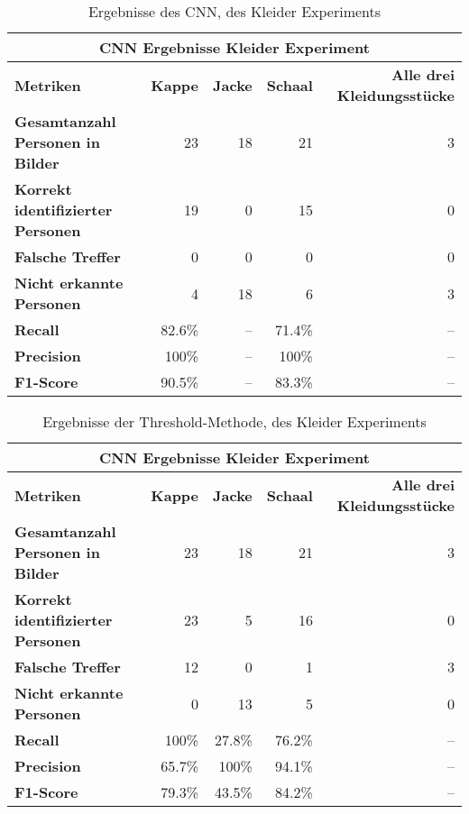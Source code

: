 {
	\renewcommand{\arraystretch}{1.3}
	\begin{table}[H]
		\centering
		\scriptsize
		\begin{tabularx}{.9\textwidth}{Xrrrr}
			\hline
			\multicolumn{5}{c}{\textbf{CNN Ergebnisse Kleider Experiment}}\\
			\hline
			\textbf{Metriken} & \textbf{Kappe} & \textbf{Jacke} & \textbf{Schaal} & \textbf{Alle drei Kleidungsstücke}\\
			\hline 
			\textbf{Gesamtanzahl Personen in Bilder} & 23 & 18 & 21 & 3\\
			\hline
			\textbf{Korrekt identifizierter Personen} & 19 & 0 & 15 & 0\\
			\hline
			\textbf{Falsche Treffer} & 0 & 0 & 0 & 0\\
			\hline
			\textbf{Nicht erkannte Personen} & 4 & 18 & 6 & 3\\
			\hline
			\textbf{Recall} & 82.6\% & -- & 71.4\% & -- \\
			\hline  
			\textbf{Precision} & 100\% & -- & 100\% & -- \\
			\hline
			\textbf{F1-Score} & 90.5\% & -- & 83.3\% & -- \\
			\hline
		\end{tabularx}
		\caption{Ergebnisse des CNN, des Kleider Experiments}
		\label{tbl:clothCNN}
	\end{table}
	\begin{table}[H]
		\centering
		\scriptsize
		\begin{tabularx}{.9\textwidth}{Xrrrr}
			\hline
			\multicolumn{5}{c}{\textbf{CNN Ergebnisse Kleider Experiment}}\\
			\hline
			\textbf{Metriken} & \textbf{Kappe} & \textbf{Jacke} & \textbf{Schaal} & \textbf{Alle drei Kleidungsstücke}\\
			\hline 
			\textbf{Gesamtanzahl Personen in Bilder} & 23 & 18 & 21 & 3\\
			\hline
			\textbf{Korrekt identifizierter Personen} & 23 & 5 & 16 & 0\\
			\hline
			\textbf{Falsche Treffer} & 12 & 0 & 1 & 3\\
			\hline
			\textbf{Nicht erkannte Personen} & 0 & 13 & 5 & 0\\
			\hline
			\textbf{Recall} & 100\% & 27.8\% & 76.2\% & -- \\
			\hline  
			\textbf{Precision} & 65.7\% & 100\% & 94.1\% & -- \\
			\hline
			\textbf{F1-Score} & 79.3\% & 43.5\% & 84.2\% & -- \\
			\hline
		\end{tabularx}
		\caption{Ergebnisse der Threshold-Methode, des Kleider Experiments}
		\label{tbl:clothThresh}
	\end{table}
}



